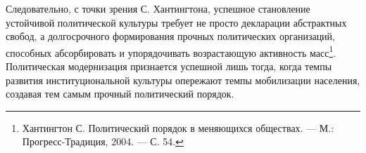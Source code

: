 Следовательно, с точки зрения С. Хантингтона, успешное становление устойчивой политической культуры требует не просто декларации абстрактных свобод, а долгосрочного формирования прочных политических организаций, способных абсорбировать и упорядочивать возрастающую активность масс\footnote{Хантингтон С. Политический порядок в меняющихся обществах. --- М.: Прогресс-Традиция, 2004. --- С. 54.}. Политическая модернизация признается успешной лишь тогда, когда темпы развития институциональной культуры опережают темпы мобилизации населения, создавая тем самым прочный политический порядок.